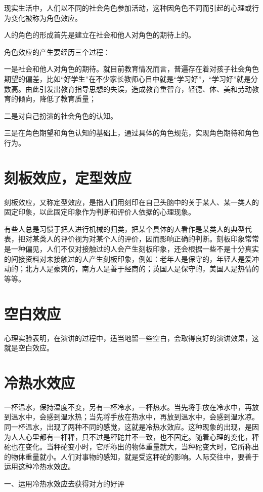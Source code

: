 \documentclass[11pt]{ctexart}
\begin{document}
现实生活中，人们以不同的社会角色参加活动，这种因角色不同而引起的心理或行为变化被称为角色效应。

人的角色的形成首先是建立在社会和他人对角色的期待上的。

角色效应的产生要经历三个过程：

一是社会和他人对角色的期待。就目前教育情况而言，普遍存在着对孩子社会角色期望的偏差，比如“好学生”在不少家长教师心目中就是“学习好”，“学习好”就是分数高。由此引发出教育指导思想的失误，造成教育重智育，轻德、体、美和劳动教育的倾向，降低了教育质量；

二是对自己扮演的社会角色的认知。

三是在角色期望和角色认知的基础上，通过具体的角色规范，实现角色期待和角色行为。
\section{刻板效应，定型效应}
\label{sec-59}


刻板效应，又称定型效应，是指人们用刻印在自己头脑中的关于某人、某一类人的固定印象，以此固定印象作为判断和评价人依据的心理现象。

有些人总是习惯于把人进行机械的归类，把某个具体的人看作是某类人的典型代表，把对某类人的评价视为对某个人的评价，因而影响正确的判断。刻板印象常常是一种偏见，人们不仅对接触过的人会产生刻板印象，还会根据一些不是十分真实的间接资料对未接触过的人产生刻板印象，例如：老年人是保守的，年轻人是爱冲动的；北方人是豪爽的，南方人是善于经商的；英国人是保守的，美国人是热情的等等。
\section{空白效应}
\label{sec-60}


心理实验表明，在演讲的过程中，适当地留一些空白，会取得良好的演讲效果，这就是空白效应。
\section{冷热水效应}
\label{sec-61}


一杯温水，保持温度不变，另有一杯冷水，一杯热水。当先将手放在冷水中，再放到温水中，会感到温水热；当先将手放在热水中，再放到温水中，会感到温水凉。同一杯温水，出现了两种不同的感觉，这就是冷热水效应。这种现象的出现，是因为人人心里都有一杆秤，只不过是秤砣并不一致，也不固定。随着心理的变化，秤砣也在变化。当秤砣变小时，它所称出的物体重量就大，当秤砣变大时，它所称出的物体重量就小。人们对事物的感知，就是受这秤砣的影响。人际交往中，要善于运用这种冷热水效应。

一、运用冷热水效应去获得对方的好评
\end{document}

